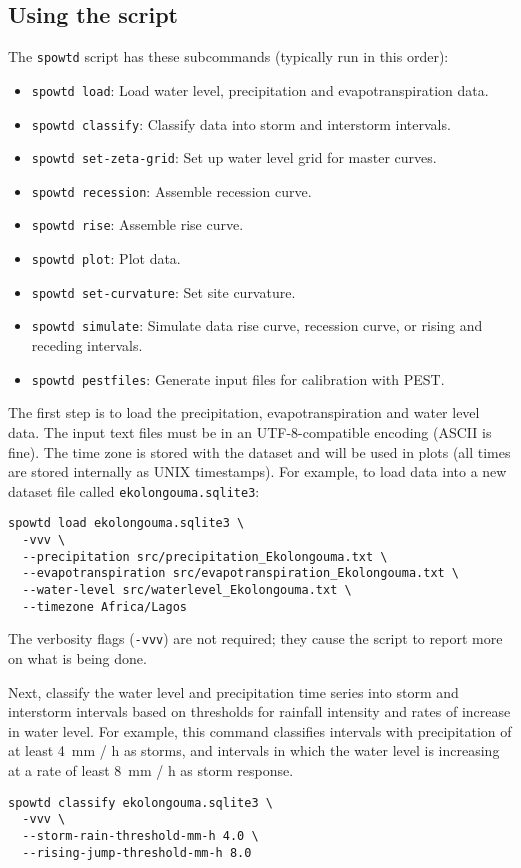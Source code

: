 \documentclass[11pt,a4paper]{article}
\begin{document}
\subsection{Using the script}
The \texttt{spowtd} script has these subcommands (typically run in
this order):
\begin{itemize}
\item \texttt{spowtd load}: Load water level, precipitation and
  evapotranspiration data.
\item \texttt{spowtd classify}: Classify data into storm and
  interstorm intervals.
\item \texttt{spowtd set-zeta-grid}: Set up water level grid for
  master curves.
\item \texttt{spowtd recession}: Assemble recession curve.
\item \texttt{spowtd rise}: Assemble rise curve.
\item \texttt{spowtd plot}: Plot data.
\item \texttt{spowtd set-curvature}: Set site curvature.
\item \texttt{spowtd simulate}: Simulate data rise curve, recession
  curve, or rising and receding intervals.
\item \texttt{spowtd pestfiles}: Generate input files for calibration
  with PEST.
\end{itemize}

The first step is to load the precipitation, evapotranspiration and
water level data.  The input text files must be in an UTF-8-compatible
encoding (ASCII is fine).  The time zone is stored with the dataset
and will be used in plots (all times are stored internally as UNIX
timestamps).  For example, to load data into a new dataset file called
\texttt{ekolongouma.sqlite3}:
\begin{lstlisting}[frame=single]
spowtd load ekolongouma.sqlite3 \
  -vvv \
  --precipitation src/precipitation_Ekolongouma.txt \
  --evapotranspiration src/evapotranspiration_Ekolongouma.txt \
  --water-level src/waterlevel_Ekolongouma.txt \
  --timezone Africa/Lagos
\end{lstlisting}
The verbosity flags (\texttt{-vvv}) are not required; they cause the
script to report more on what is being done.

Next, classify the water level and precipitation time series into
storm and interstorm intervals based on thresholds for rainfall
intensity and rates of increase in water level.  For example, this
command classifies intervals with precipitation of at least 4~mm / h
as storms, and intervals in which the water level is increasing at a
rate of least 8~mm / h as storm response.
\begin{lstlisting}[frame=single]
spowtd classify ekolongouma.sqlite3 \
  -vvv \
  --storm-rain-threshold-mm-h 4.0 \
  --rising-jump-threshold-mm-h 8.0
\end{lstlisting}
\end{document}
